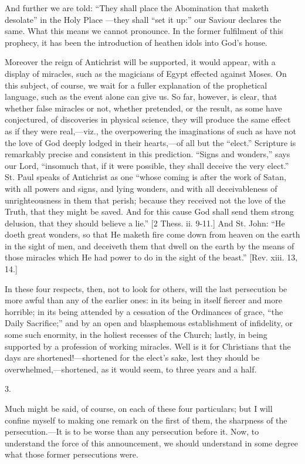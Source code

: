 And further we are told: ``They shall place the Abomination
that maketh desolate'' in the Holy Place —they shall
``set it up:'' our Saviour declares the same. What this means
we cannot pronounce. In the former fulfilment of this prophecy, it has
been the introduction of heathen idols into God's house.

Moreover the reign of Antichrist will be supported, it would
appear, with a display of miracles, such as the magicians of Egypt
effected against Moses. On this subject, of course, we wait for a
fuller explanation of the prophetical language, such as the event
alone can give us. So far, however, is clear, that whether false
miracles or not, whether pretended, or the result, as some have
conjectured, of discoveries in physical science, they will produce the
same effect as if they were real,—viz., the overpowering the
imaginations of such as have not the love of God deeply lodged in
their hearts,—of all but the ``elect.'' Scripture is
remarkably precise and consistent in this prediction. ``Signs and
wonders,'' says our Lord, ``insomuch that, if it were
possible, they shall deceive the very elect.'' St. Paul speaks of
Antichrist as one ``whose coming is after the work of Satan, with
all powers and signs, and lying wonders, and with all deceivableness
of unrighteousness in them that perish; because they received not the
love of the Truth, that they might be saved. And for this cause God
shall send them strong delusion, that they should believe a lie.''
[2 Thess. ii. 9-11.] And St. John: ``He doeth great wonders, so
that He maketh fire come down from heaven on the earth in the sight of
men, and deceiveth them that dwell on the earth by the means of those
miracles which He had power to do in the sight of the beast.''
[Rev. xiii. 13, 14.]

In these four respects, then, not to look for others, will the last
persecution be more awful than any of the earlier ones: in its being
in itself fiercer and more horrible; in its being attended by a
cessation of the Ordinances of grace, ``the Daily Sacrifice;''
and by an open and blasphemous establishment of infidelity, or some
such enormity, in the holiest recesses of the Church; lastly, in being
supported by a profession of working miracles. Well is it for
Christians that the days are shortened!—shortened for the elect's
sake, lest they should be overwhelmed,—shortened, as it would seem,
to three years and a half.

3.

Much might be said, of course, on each of these four particulars;
but I will confine myself to making one remark on the first of them,
the sharpness of the persecution.—It is to be worse than any
persecution before it. Now, to understand the force of this
announcement, we should understand in some degree what those former
persecutions were.

